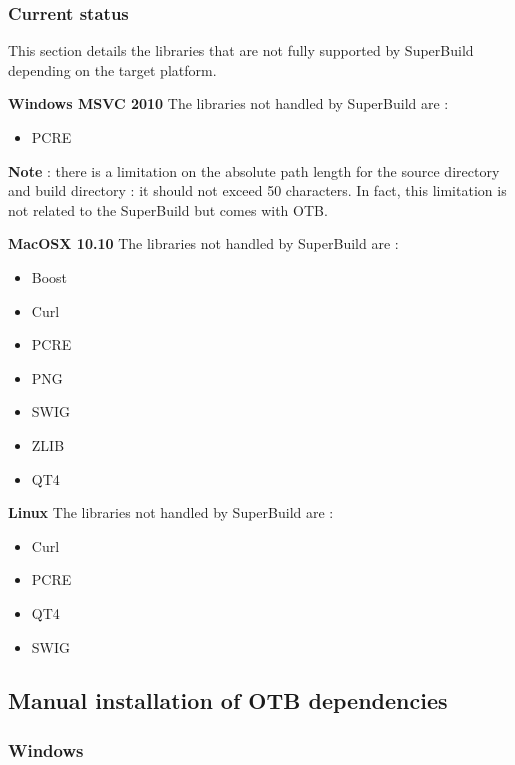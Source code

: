 \subsubsection{Current status}

This section details the libraries that are not fully supported by SuperBuild depending on the target platform. 

\textbf{Windows MSVC 2010}
\newline
The libraries not handled by SuperBuild are : 
\begin{itemize}
	\item PCRE
\end{itemize}

\textbf{Note} : there is a limitation on the absolute path length for the source directory and build directory : it should not exceed 50 characters. In fact, this limitation is not related to the SuperBuild but comes with OTB.

\textbf{MacOSX 10.10}
\newline
The libraries not handled by SuperBuild are : 
\begin{itemize}
	\item Boost
	\item Curl
	\item PCRE
	\item PNG
	\item SWIG
	\item ZLIB
	\item QT4
\end{itemize}

\textbf{Linux}
\newline
The libraries not handled by SuperBuild are : 
\begin{itemize}
	\item Curl
	\item PCRE
	\item QT4
	\item SWIG
\end{itemize}


\subsection{Manual installation of OTB dependencies}
\label{sec:manualdependencies}

\subsubsection{Windows}

